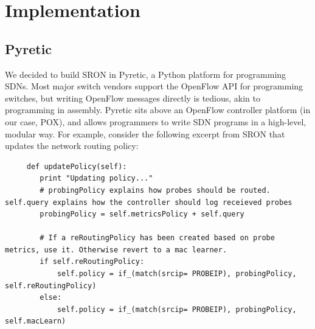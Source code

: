 \documentclass[pageno]{jpaper}
\begin{document}
\section{Implementation}
\subsection{Pyretic}
	We decided to build SRON in Pyretic\cite{pyretic}, a Python platform for programming SDNs.  Most major switch vendors support the OpenFlow API for programming switches, but writing OpenFlow messages directly is tedious, akin to programming in assembly. Pyretic sits above an OpenFlow controller platform (in our case, POX\cite{pox}), and allows programmers to write SDN programs in a high-level, modular way.  For example, consider the following excerpt from SRON that updates the network routing policy:\bigskip




	\begin{lstlisting}
	 def updatePolicy(self):
		print "Updating policy..."
		# probingPolicy explains how probes should be routed. self.query explains how the controller should log receieved probes
		probingPolicy = self.metricsPolicy + self.query

		# If a reRoutingPolicy has been created based on probe metrics, use it. Otherwise revert to a mac learner.
		if self.reRoutingPolicy:	
			self.policy = if_(match(srcip= PROBEIP), probingPolicy, self.reRoutingPolicy)
		else:
			self.policy = if_(match(srcip= PROBEIP), probingPolicy, self.macLearn)
	\end{lstlisting} 
\end{document}
